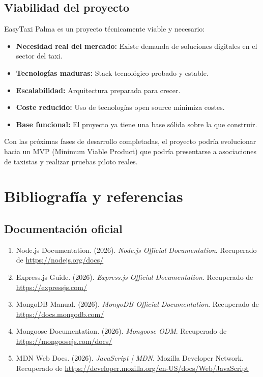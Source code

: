 \documentclass[12pt,a4paper]{article}
\begin{document}
\subsection{Viabilidad del proyecto}

EasyTaxi Palma es un proyecto técnicamente viable y necesario:

\begin{itemize}
    \item \textbf{Necesidad real del mercado:} Existe demanda de soluciones digitales en el sector del taxi.
    \item \textbf{Tecnologías maduras:} Stack tecnológico probado y estable.
    \item \textbf{Escalabilidad:} Arquitectura preparada para crecer.
    \item \textbf{Coste reducido:} Uso de tecnologías open source minimiza costes.
    \item \textbf{Base funcional:} El proyecto ya tiene una base sólida sobre la que construir.
\end{itemize}

Con las próximas fases de desarrollo completadas, el proyecto podría evolucionar hacia un MVP (Minimum Viable Product) que podría presentarse a asociaciones de taxistas y realizar pruebas piloto reales.

\newpage

\section{Bibliografía y referencias}

\subsection{Documentación oficial}

\begin{enumerate}
    \item Node.js Documentation. (2026). \textit{Node.js Official Documentation}. Recuperado de \url{https://nodejs.org/docs/}
    
    \item Express.js Guide. (2026). \textit{Express.js Official Documentation}. Recuperado de \url{https://expressjs.com/}
    
    \item MongoDB Manual. (2026). \textit{MongoDB Official Documentation}. Recuperado de \url{https://docs.mongodb.com/}
    
    \item Mongoose Documentation. (2026). \textit{Mongoose ODM}. Recuperado de \url{https://mongoosejs.com/docs/}
    
    \item MDN Web Docs. (2026). \textit{JavaScript | MDN}. Mozilla Developer Network. Recuperado de \url{https://developer.mozilla.org/en-US/docs/Web/JavaScript}
    

\end{enumerate}
\end{document}
